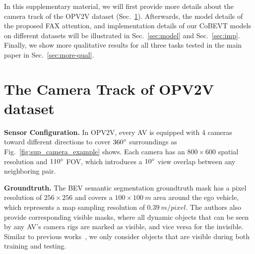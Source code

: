 \documentclass{article}
\begin{document}
{In this supplementary material, we will first provide more details about the camera track of the OPV2V dataset (Sec.~\ref{sec:opv2v-cam}). Afterwards, {{the model details of the proposed FAX attention, and} } implementation details of our CoBEVT models on different datasets will be illustrated in Sec.~\ref{sec:model} and Sec.~\ref{sec:imp}. Finally, we show more qualitative results for all three tasks tested in the main paper in Sec.~\ref{sec:more-qual}.

\section{The Camera Track of OPV2V dataset}
\label{sec:opv2v-cam}
\noindent\textbf{Sensor Configuration.} In OPV2V, every AV is equipped with 4 cameras toward different directions to cover $360\degree$ surroundings as Fig.~\ref{fig:sup_camera_example} shows. Each camera has an $800\times600$ spatial resolution and $110\degree$ FOV, which introduces a $10\degree$ view overlap between any neighboring pair. 

\noindent\textbf{Groundtruth.} The BEV semantic segmentation groundtruth mask has a pixel resolution of $256\times256$ and covers a $100\times100~m$ area around the ego vehicle, which represents a map sampling resolution of $0.39 ~m/pixel$. The authors also provide corresponding visible masks, where all dynamic objects that can be seen by any AV's camera rigs are marked as visible, and vice versa for the invisible. Similar to previous works~\cite{zhou2022cross, hu2021fiery}, we only consider objects that are visible during both training and testing.


}
\end{document}
